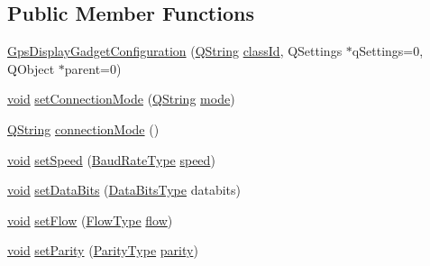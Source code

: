 \subsection*{Public Member Functions}
\begin{DoxyCompactItemize}
\item 
\hyperlink{group___g_p_s_gadget_plugin_ga9ce38cb5c86c5783c8b96457d926f9c4}{Gps\-Display\-Gadget\-Configuration} (\hyperlink{group___u_a_v_objects_plugin_gab9d252f49c333c94a72f97ce3105a32d}{Q\-String} \hyperlink{group___core_plugin_gac953657221ba7fda967ada0408332641}{class\-Id}, Q\-Settings $\ast$q\-Settings=0, Q\-Object $\ast$parent=0)
\item 
\hyperlink{group___u_a_v_objects_plugin_ga444cf2ff3f0ecbe028adce838d373f5c}{void} \hyperlink{group___g_p_s_gadget_plugin_ga0025e5ae0ab4f8a16c2b69a4aef3a8be}{set\-Connection\-Mode} (\hyperlink{group___u_a_v_objects_plugin_gab9d252f49c333c94a72f97ce3105a32d}{Q\-String} \hyperlink{glext_8h_a1e71d9c196e4683cc06c4b54d53f7ef5}{mode})
\item 
\hyperlink{group___u_a_v_objects_plugin_gab9d252f49c333c94a72f97ce3105a32d}{Q\-String} \hyperlink{group___g_p_s_gadget_plugin_ga77783cad102ac5a0338e0fe296402b23}{connection\-Mode} ()
\item 
\hyperlink{group___u_a_v_objects_plugin_ga444cf2ff3f0ecbe028adce838d373f5c}{void} \hyperlink{group___g_p_s_gadget_plugin_gaf15cd0543ca6d85d3593905f8e8b7301}{set\-Speed} (\hyperlink{qextserialport_8h_a6f031169a6a9b150b5af707bb23cf010}{Baud\-Rate\-Type} \hyperlink{group___g_p_s_gadget_plugin_gae316339027f90f81c50cb8b1abffd2bd}{speed})
\item 
\hyperlink{group___u_a_v_objects_plugin_ga444cf2ff3f0ecbe028adce838d373f5c}{void} \hyperlink{group___g_p_s_gadget_plugin_ga30b358e2d5b28de7d18749cfb6dbf9cb}{set\-Data\-Bits} (\hyperlink{qextserialport_8h_a189ef78c2c1b7537ab114d576f6214fa}{Data\-Bits\-Type} databits)
\item 
\hyperlink{group___u_a_v_objects_plugin_ga444cf2ff3f0ecbe028adce838d373f5c}{void} \hyperlink{group___g_p_s_gadget_plugin_ga56ec26969426f55eb39373779ba78ddb}{set\-Flow} (\hyperlink{qextserialport_8h_a02ad1c7cf791a069dd54e409f8db4790}{Flow\-Type} \hyperlink{group___g_p_s_gadget_plugin_ga971f5af6d2fe2353c15f6b88550339ec}{flow})
\item 
\hyperlink{group___u_a_v_objects_plugin_ga444cf2ff3f0ecbe028adce838d373f5c}{void} \hyperlink{group___g_p_s_gadget_plugin_gaea8c500878652f4b518a990e0f6ee05a}{set\-Parity} (\hyperlink{qextserialport_8h_aee22d32d87c815090354bf9b8e957ace}{Parity\-Type} \hyperlink{group___g_p_s_gadget_plugin_ga3a0d09e79d337c15dbc032ae237a8663}{parity})

\end{DoxyCompactItemize}
